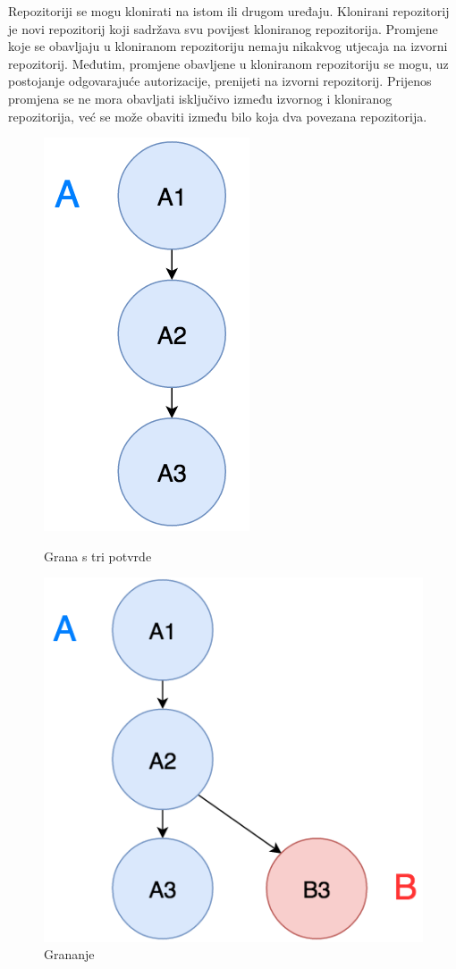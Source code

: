 \documentclass[times, utf8, diplomski, numeric]{fer}
\begin{document}
Repozitoriji se mogu klonirati na istom ili drugom uređaju. Klonirani repozitorij je novi repozitorij koji sadržava svu povijest kloniranog repozitorija. Promjene koje se obavljaju u kloniranom repozitoriju nemaju nikakvog utjecaja na izvorni repozitorij. Međutim, promjene obavljene u kloniranom repozitoriju se mogu, uz postojanje odgovarajuće autorizacije, prenijeti na izvorni repozitorij. Prijenos promjena se ne mora obavljati isključivo između izvornog i kloniranog repozitorija, već se može obaviti između bilo koja dva povezana repozitorija.

\begin{figure}[b!]
\centering
\begin{minipage}{.5\textwidth}
\centering
\includegraphics[scale=0.6]{Initial_commit}
\caption{Grana s tri potvrde}
\label{fig:Initial_commit}
\end{minipage}%
\begin{minipage}{.5\textwidth}
\centering
\includegraphics[scale=0.6]{Branching}
\caption{Grananje}
\label{fig:Branching}
\end{minipage}
\end{figure}
\end{document}
